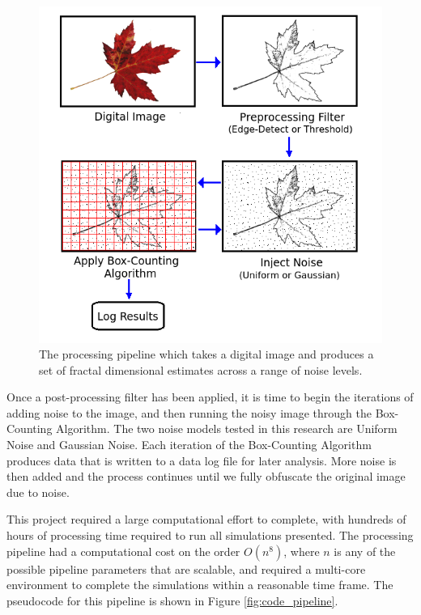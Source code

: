 \documentclass[12pt, oneside]{book}
\begin{document}
\begin{figure}[!b]
  \centering
  \includegraphics[width=\textwidth]{figures/process.png}
  \caption[The processing pipeline which takes a digital image and produces a set of fractal dimensional estimates across a range of noise levels.]{The processing pipeline which takes a digital image and produces a set of fractal dimensional estimates across a range of noise levels.}
  \label{fig:process}
\end{figure}

Once a post-processing filter has been applied, it is time to begin the iterations of adding noise to the image, and then running the noisy image through the Box-Counting Algorithm.  The two noise models tested in this research are Uniform Noise and Gaussian Noise.  Each iteration of the Box-Counting Algorithm produces data that is written to a data log file for later analysis.  More noise is then added and the process continues until we fully obfuscate the original image due to noise. 

This project required a large computational effort to complete, with hundreds of hours of processing time required to run all simulations presented.  The processing pipeline had a computational cost on the order \(O(n^{8})\), where \(n\) is any of the possible pipeline parameters that are scalable, and required a multi-core environment to complete the simulations within a reasonable time frame.  The pseudocode for this pipeline is shown in Figure \ref{fig:code_pipeline}.
\end{document}

